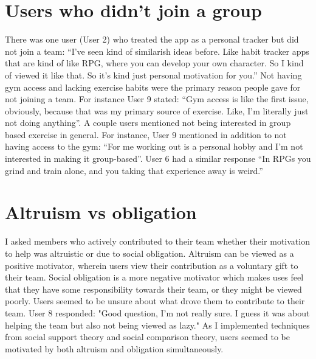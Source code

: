 \documentclass{l4proj}
\begin{document}
\section{Users who didn't join a group}
There was one user (User 2) who treated the app as a personal tracker but did not join a team: ``I've seen kind of similarish ideas before. Like habit tracker apps that are kind of like RPG, where you can develop your own character. So I kind of viewed it like that. So it's kind just personal motivation for you.'' Not having gym access and lacking exercise habits were the primary reason people gave for not joining a team.  For instance User 9 stated: ``Gym access is like the first issue, obviously, because that was my primary source of exercise. Like, I'm literally just not doing anything''. A couple users mentioned not being interested in group based exercise in general. For instance, User 9 mentioned in addition to not having access to the gym: ``For me working out is a personal hobby and I'm not interested in making it group-based''. User 6 had a similar response ``In RPGs you grind and train alone, and you taking that experience away is weird.''

\section{Altruism vs obligation}
I asked members who actively contributed to their team whether their motivation to help was altruistic or due to social obligation. Altruism can be viewed as a positive motivator, wherein users view their contribution as a voluntary gift to their team. Social obligation is a more negative motivator which makes uses feel that they have some responsibility towards their team, or they might be viewed poorly. Users seemed to be unsure about what drove them to contribute to their team. User 8 responded: "Good question, I'm not really sure. I guess it was about helping the team but also not being viewed as lazy." As I implemented techniques from social support theory and social comparison theory, users seemed to be motivated by both altruism and obligation simultaneously.
\end{document}
